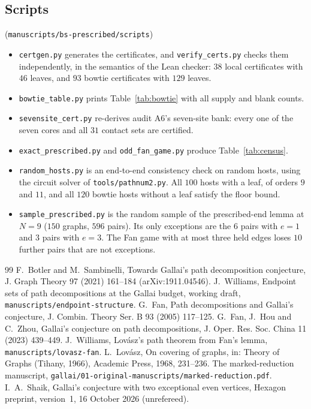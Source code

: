 \documentclass[11pt]{amsart}
\theoremstyle{definition}
\begin{document}
\subsection*{Scripts} (\texttt{manuscripts/bs-prescribed/scripts})
\begin{itemize}
\item \texttt{certgen.py} generates the certificates, and \texttt{verify\_certs.py} checks them
independently, in the semantics of the Lean checker: $38$ local certificates with $46$ leaves, and
$93$ bowtie certificates with $129$ leaves.
\item \texttt{bowtie\_table.py} prints Table~\ref{tab:bowtie} with all supply and blank counts.
\item \texttt{sevensite\_cert.py} re-derives audit A6's seven-site bank: every one of the seven cores
and all $31$ contact sets are certified.
\item \texttt{exact\_prescribed.py} and \texttt{odd\_fan\_game.py} produce Table~\ref{tab:census}.
\item \texttt{random\_hosts.py} is an end-to-end consistency check on random hosts, using the circuit
solver of \texttt{tools/pathnum2.py}. All $100$ hosts with a leaf, of orders $9$ and $11$, and all
$120$ bowtie hosts without a leaf satisfy the floor bound.
\item \texttt{sample\_prescribed.py} is the random sample of the prescribed-end lemma at $N=9$
($150$ graphs, $596$ pairs). Its only exceptions are the $6$ pairs with $e=1$ and $3$ pairs with $e=3$.
The Fan game with at most three held edges loses $10$ further pairs that are not exceptions.
\end{itemize}

\begin{thebibliography}{99}
 F.~Botler and M.~Sambinelli, Towards Gallai's path decomposition conjecture, J. Graph
Theory 97 (2021) 161--184 (arXiv:1911.04546).
 J.~Williams, Endpoint sets of path decompositions at the Gallai budget, working draft,
\texttt{manuscripts/endpoint-structure}.
 G.~Fan, Path decompositions and Gallai's conjecture, J. Combin. Theory Ser. B 93 (2005)
117--125.
 G.~Fan, J.~Hou and C.~Zhou, Gallai's conjecture on path decompositions, J. Oper. Res.
Soc. China 11 (2023) 439--449.
 J.~Williams, Lov\'asz's path theorem from Fan's lemma, \texttt{manuscripts/lovasz-fan}.
 L.~Lov\'asz, On covering of graphs, in: Theory of Graphs (Tihany, 1966), Academic
Press, 1968, 231--236.
 The marked-reduction manuscript, \texttt{gallai/01-original-manuscripts/marked-reduction.pdf}.
 I.~A.~Shaik, Gallai's conjecture with two exceptional even vertices, Hexagon preprint,
version~1, 16 October 2026 (unrefereed).
\end{thebibliography}
\end{document}
